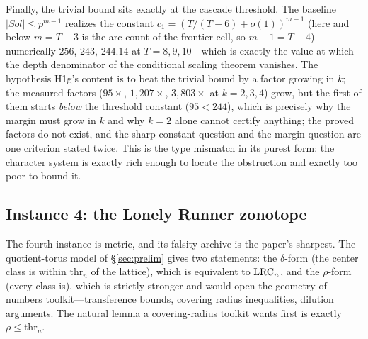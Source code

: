 Finally, the trivial bound sits exactly at the cascade threshold. The
baseline $|Sol|\le p^{m-1}$ realizes the constant
$c_1=(T/(T-6)+o(1))^{m-1}$ (here and below $m=T-3$ is the arc count of
the frontier cell, so $m-1=T-4$)---numerically $256$, $243$, $244.14$ at
$T=8,9,10$---which is exactly the value at which the depth denominator
of the conditional scaling theorem vanishes. The hypothesis H1g's
content is to beat the trivial bound by a factor growing in $k$; the
measured factors ($95\times$, $1{,}207\times$, $3{,}803\times$ at
$k=2,3,4$) grow, but the first of them starts \emph{below} the
threshold constant ($95<244$), which is precisely why the margin must
grow in $k$ and why $k=2$ alone cannot certify anything; the proved
factors do not exist, and the sharp-constant question and the margin
question are one criterion stated twice. This is the type mismatch in its purest
form: the character system is exactly rich enough to locate the
obstruction and exactly too poor to bound it.

\subsection{Instance 4: the Lonely Runner zonotope}\label{sec:tm-zono}

The fourth instance is metric, and its falsity archive is the paper's
sharpest. The quotient-torus model of \S\ref{sec:prelim} gives two
statements: the $\delta$-form (the center class is within
$\mathrm{thr}_n$ of the lattice), which is equivalent to $\mathrm{LRC}_n$, and
the $\rho$-form (every class is), which is strictly stronger and would
open the geometry-of-numbers toolkit---transference bounds, covering
radius inequalities, dilution arguments. The natural lemma a
covering-radius toolkit wants first is exactly $\rho\le\mathrm{thr}_n$.

